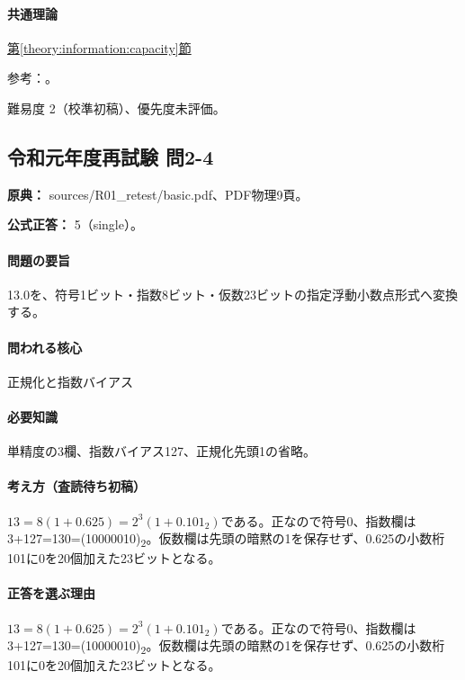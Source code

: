 \paragraph{共通理論} \hyperref[theory:information:capacity]{第\ref*{theory:information:capacity}節}

\par 参考：\cite{nist_binary_prefix}。

\par 難易度 2（校準初稿）、優先度未評価。

\subsection{令和元年度再試験 問2-4}
\label{q:r01-ret-basic-2-4}

\noindent\textbf{原典：} sources/R01\_retest/basic.pdf、PDF物理9頁。

\textbf{公式正答：} 5（single）。

\paragraph{問題の要旨} 13.0を、符号1ビット・指数8ビット・仮数23ビットの指定浮動小数点形式へ変換する。

\paragraph{問われる核心} 正規化と指数バイアス

\paragraph{必要知識} 単精度の3欄、指数バイアス127、正規化先頭1の省略。

\paragraph{考え方（査読待ち初稿）} \(13=8(1+0.625)=2^3(1+0.101_2)\)である。正なので符号0、指数欄は3+127=130=(10000010)\textsubscript{2}。仮数欄は先頭の暗黙の1を保存せず、0.625の小数桁101に0を20個加えた23ビットとなる。

\paragraph{正答を選ぶ理由} \(13=8(1+0.625)=2^3(1+0.101_2)\)である。正なので符号0、指数欄は3+127=130=(10000010)\textsubscript{2}。仮数欄は先頭の暗黙の1を保存せず、0.625の小数桁101に0を20個加えた23ビットとなる。

